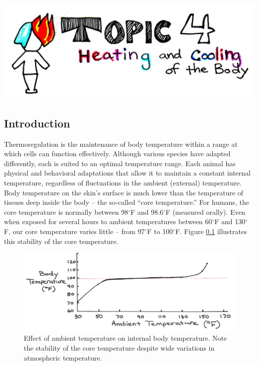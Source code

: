 \setcounter{chapter}{4}
\setcounter{section}{0}
\setcounter{figure}{0}
\setcounter{equation}{0}
\setcounter{table}{0}
\chapter*{\includegraphics[width=\textwidth]{./figures/Topic4/Topic4.jpg}}

\section{Introduction}

Thermoregulation is the maintenance of body temperature within a range at which cells can function effectively.  Although various species have adapted differently, each is suited to an optimal temperature range.  Each animal has physical and behavioral adaptations that allow it to maintain a constant internal temperature, regardless of fluctuations in the ambient (external) temperature.  
Body temperature on the skin’s surface is much lower than the temperature of tissues deep inside the body -- the so-called ``core temperature.''  For humans, the core temperature is normally between 98$^{\circ}$F and 98.6$^{\circ}$F (measured orally).  Even when exposed for several hours to ambient temperatures between 60$^{\circ}$F and 130$^{\circ}$F, our core temperature varies little -- from 97$^{\circ}$F to 100$^{\circ}$F.  Figure \ref{Fig4-1} illustrates this stability of the core temperature.
\begin{figure}[h]
	\centering
	\includegraphics[width=\textwidth]{./figures/Topic4/Fig4-1.jpg}
	\caption{Effect of ambient temperature on internal body temperature.  Note the stability of the core temperature despite wide variations in atmospheric temperature.}
	\label{Fig4-1}
\end{figure}  

